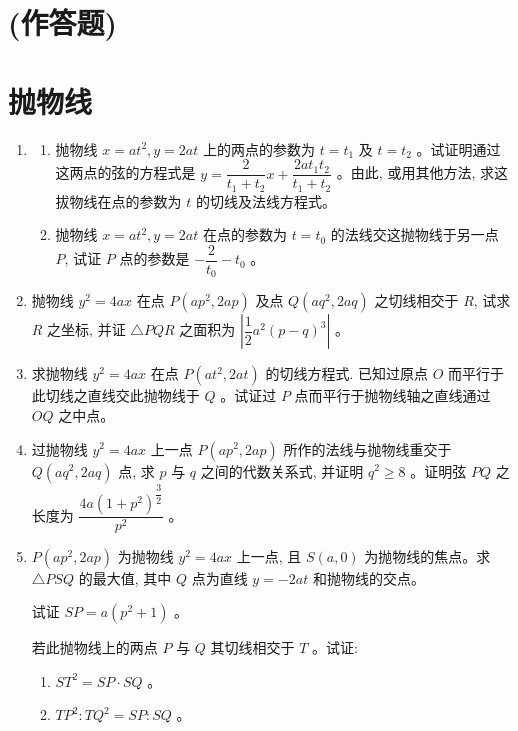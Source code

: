 \documentclass[10pt]{article}
\begin{document}
\section*{(作答题)}
\section*{抛物线}
\begin{enumerate}
  \item \begin{enumerate}
    \item 抛物线 $x=a t^{2}, y=2 a t$ 上的两点的参数为 $t=t_{1}$ 及 $t=t_{2}$ 。试证明通过这两点的弦的方程式是 $y=\dfrac{2}{t_{1}+t_{2}} x+\dfrac{2 a t_{1} t_{2}}{t_{1}+t_{2}}$ 。由此, 或用其他方法, 求这拔物线在点的参数为 $t$ 的切线及法线方程式。

    \item 抛物线 $x=a t^{2}, y=2 a t$ 在点的参数为 $t=t_{0}$ 的法线交这抛物线于另一点 $P$, 试证 $P$ 点的参数是 $-\dfrac{2}{t_{0}}-t_{0}$ 。
  \end{enumerate}

  \item 抛物线 $y^{2}=4 a x$ 在点 $P\left(a p^{2}, 2 a p\right)$ 及点 $Q\left(a q^{2}, 2 a q\right)$ 之切线相交于 $R$, 试求 $R$ 之坐标, 并证 $\triangle PQR$ 之面积为 $\left|\dfrac{1}{2} a^{2}(p-q)^{3}\right|$ 。
  \item 求抛物线 $y^{2}=4 a x$ 在点 $P\left(a t^{2}, 2 a t\right)$ 的切线方程式. 已知过原点 $O$ 而平行于此切线之直线交此抛物线于 $Q$ 。试证过 $P$ 点而平行于抛物线轴之直线通过 $O Q$ 之中点。
  \item 过抛物线 $y^{2}=4 a x$ 上一点 $P\left(a p^{2}, 2 a p\right)$ 所作的法线与抛物线重交于 $Q\left(a q^{2}, 2 a q\right)$ 点, 求 $p$ 与 $q$ 之间的代数关系式, 并证明 $q^{2} \geq 8$ 。证明弦 $PQ$ 之长度为 $\dfrac{4 a\left(1+p^{2}\right)^{\dfrac{3}{2}}}{p^{2}}$ 。
  \item $P\left(a p^{2}, 2 a p\right)$ 为抛物线 $y^{2}=4 a x$ 上一点, 且 $S(a, 0)$ 为抛物线的焦点。求 $\triangle PSQ$ 的最大值, 其中 $Q$ 点为直线 $y=-2 a t$ 和抛物线的交点。

  试证 $SP=a\left(p^{2}+1\right)$ 。

  若此抛物线上的两点 $P$ 与 $Q$ 其切线相交于 $T$ 。试证:
        \begin{enumerate}
            \item $ST^{2}=SP \cdot SQ$ 。
            \item $TP^{2}: TQ^{2}=SP: SQ$ 。
        \end{enumerate}
    

\end{enumerate}
\end{document}
